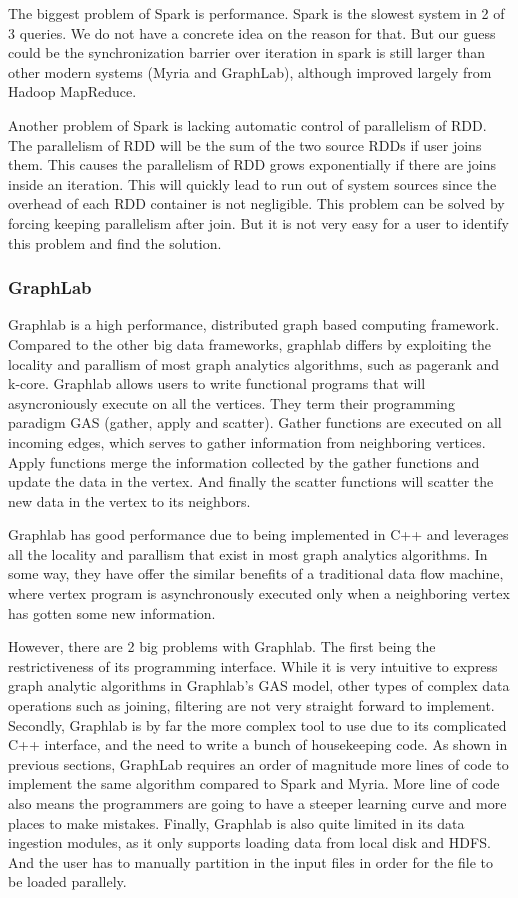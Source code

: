 The biggest problem of Spark is performance. Spark is the slowest system in 2 
of 3 queries. We do not have a concrete idea on the reason for that. But our 
guess could be the synchronization barrier over iteration in spark is still 
larger than other modern systems (Myria and GraphLab), although improved 
largely from Hadoop MapReduce.

Another problem of Spark is lacking automatic control of parallelism of RDD. 
The parallelism of RDD will be the sum of the two source RDDs if user joins
them. This causes the parallelism of RDD grows exponentially if there are
joins inside an iteration. This will quickly lead to run out of system 
sources since the overhead of each RDD container is not negligible. This 
problem can be solved by forcing keeping parallelism after join. But it is
not very easy for a user to identify this problem and find the solution.   
    
\subsubsection{GraphLab}

Graphlab is a high performance, distributed graph based computing framework. Compared to the other big data frameworks, graphlab differs by exploiting the locality and parallism of most graph analytics algorithms, such as pagerank and k-core. Graphlab allows users to write functional programs that will asyncroniously execute on all the vertices. They term their programming paradigm GAS (gather, apply and scatter). Gather functions are executed on all incoming edges, which serves to gather information from neighboring vertices. Apply functions merge the information collected by the gather functions and update the data in the vertex. And finally the scatter functions will scatter the new data in the vertex to its neighbors.

Graphlab has good performance due to being implemented in C++ and leverages all the locality and parallism that exist in most graph analytics algorithms. In some way, they have offer the similar benefits of a traditional data flow machine, where vertex program is asynchronously executed only when a neighboring vertex has gotten some new information.

However, there are 2 big problems with Graphlab. The first being the restrictiveness of its programming interface. While it is very intuitive to express graph analytic algorithms in Graphlab's GAS model, other types of complex data operations such as joining, filtering are not very straight forward to implement. Secondly, Graphlab is by far the more complex tool to use due to its complicated C++ interface, and the need to write a bunch of housekeeping code. As shown in previous sections, GraphLab requires an order of magnitude more lines of code to implement the same algorithm compared to Spark and Myria. More line of code also means the programmers are going to have a steeper learning curve and more places to make mistakes. Finally, Graphlab is also quite limited in its data ingestion modules, as it only supports loading data from local disk and HDFS. And the user has to manually partition in the input files in order for the file to be loaded parallely.


